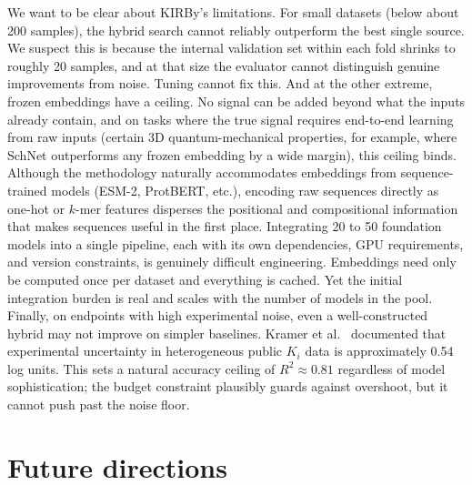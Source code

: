 {%
We want to be clear about KIRBy's limitations. For small datasets (below about 200 samples), the hybrid search cannot reliably outperform the best single source. We suspect this is because the internal validation set within each fold shrinks to roughly 20 samples, and at that size the evaluator cannot distinguish genuine improvements from noise. Tuning cannot fix this. And at the other extreme, frozen embeddings have a ceiling. No signal can be added beyond what the inputs already contain, and on tasks where the true signal requires end-to-end learning from raw inputs (certain 3D quantum-mechanical properties, for example, where SchNet outperforms any frozen embedding by a wide margin), this ceiling binds. Although the methodology naturally accommodates embeddings from sequence-trained models (ESM-2, ProtBERT, etc.), encoding raw sequences directly as one-hot or $k$-mer features disperses the positional and compositional information that makes sequences useful in the first place. Integrating 20 to 50 foundation models into a single pipeline, each with its own dependencies, GPU requirements, and version constraints, is genuinely difficult engineering. Embeddings need only be computed once per dataset and everything is cached. Yet the initial integration burden is real and scales with the number of models in the pool. Finally, on endpoints with high experimental noise, even a well-constructed hybrid may not improve on simpler baselines. Kramer et al.\ \citep{Kramer2012} documented that experimental uncertainty in heterogeneous public $K_i$ data is approximately 0.54 log units. This sets a natural accuracy ceiling of $R^2 \approx 0.81$ regardless of model sophistication; the budget constraint plausibly guards against overshoot, but it cannot push past the noise floor.

\section{Future directions}


}
